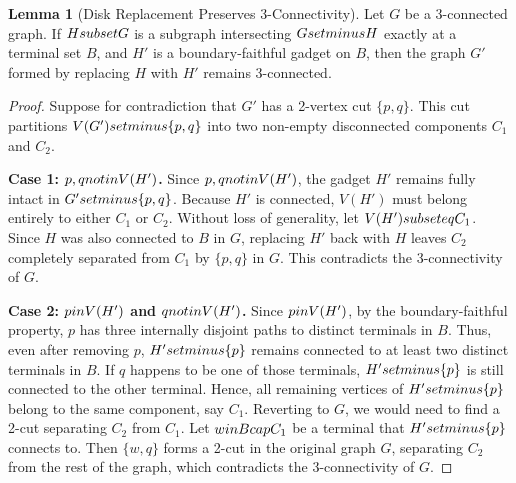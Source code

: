 \documentclass[12pt]{article}
\theoremstyle{definition}
\newtheorem{lemma}[theorem]{Lemma}
\begin{document}
\begin{lemma}[Disk Replacement Preserves 3-Connectivity]
\label{lemma:disk_replacement_3conn}
Let $G$ be a 3-connected graph. If $H \\subset G$ is a subgraph intersecting $G \\setminus H$ exactly at a terminal set $B$, and $H'$ is a boundary-faithful gadget on $B$, then the graph $G'$ formed by replacing $H$ with $H'$ remains 3-connected.
\end{lemma}
\begin{proof}
Suppose for contradiction that $G'$ has a 2-vertex cut $\{p, q\}$. This cut partitions $V(G') \\setminus \{p, q\}$ into two non-empty disconnected components $C_1$ and $C_2$.

\textbf{Case 1: $p, q \\notin V(H')$.}
Since $p, q \\notin V(H')$, the gadget $H'$ remains fully intact in $G' \\setminus \{p, q\}$. Because $H'$ is connected, $V(H')$ must belong entirely to either $C_1$ or $C_2$. Without loss of generality, let $V(H') \\subseteq C_1$. Since $H$ was also connected to $B$ in $G$, replacing $H'$ back with $H$ leaves $C_2$ completely separated from $C_1$ by $\{p, q\}$ in $G$. This contradicts the 3-connectivity of $G$.

\textbf{Case 2: $p \\in V(H')$ and $q \\notin V(H')$.}
Since $p \\in V(H')$, by the boundary-faithful property, $p$ has three internally disjoint paths to distinct terminals in $B$. Thus, even after removing $p$, $H' \\setminus \{p\}$ remains connected to at least two distinct terminals in $B$. If $q$ happens to be one of those terminals, $H' \\setminus \{p\}$ is still connected to the other terminal. Hence, all remaining vertices of $H' \\setminus \{p\}$ belong to the same component, say $C_1$. Reverting to $G$, we would need to find a 2-cut separating $C_2$ from $C_1$. Let $w \\in B \\cap C_1$ be a terminal that $H' \\setminus \{p\}$ connects to. Then $\{w, q\}$ forms a 2-cut in the original graph $G$, separating $C_2$ from the rest of the graph, which contradicts the 3-connectivity of $G$.


\end{proof}
\end{document}
